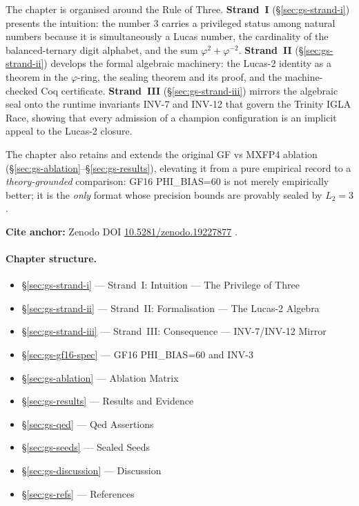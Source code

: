 The chapter is organised around the Rule of Three.
\textbf{Strand~I} (§\ref{sec:gs-strand-i}) presents the
intuition: the number $3$ carries a privileged status among
natural numbers because it is simultaneously a Lucas number,
the cardinality of the balanced-ternary digit alphabet, and
the sum $\varphi^2 + \varphi^{-2}$.  \textbf{Strand~II}
(§\ref{sec:gs-strand-ii}) develops the formal algebraic
machinery: the Lucas-2 identity as a theorem in the
$\varphi$-ring, the sealing theorem and its proof, and the
machine-checked Coq certificate.  \textbf{Strand~III}
(§\ref{sec:gs-strand-iii}) mirrors the algebraic seal onto
the runtime invariants INV-7 and INV-12 that govern the
Trinity IGLA Race, showing that every admission of a
champion configuration is an implicit appeal to the Lucas-2
closure.

The chapter also retains and extends the original GF vs
MXFP4 ablation (§\ref{sec:gs-ablation}--§\ref{sec:gs-results}),
elevating it from a pure empirical record to a
\emph{theory-grounded} comparison: GF16 PHI\_BIAS=60 is not
merely empirically better; it is the \emph{only} format
whose precision bounds are provably sealed by $L_2 = 3$.

\bigskip
\noindent\textbf{Cite anchor:}
Zenodo DOI \href{https://doi.org/10.5281/zenodo.19227877}{10.5281/zenodo.19227877}
\citep{zenodo_trinity_anchor_2026}.

\paragraph{Chapter structure.}
\begin{itemize}\tightlist
  \item §\ref{sec:gs-strand-i} — Strand~I: Intuition — The Privilege of Three
  \item §\ref{sec:gs-strand-ii} — Strand~II: Formalisation — The Lucas-2 Algebra
  \item §\ref{sec:gs-strand-iii} — Strand~III: Consequence — INV-7/INV-12 Mirror
  \item §\ref{sec:gs-gf16-spec} — GF16 PHI\_BIAS=60 and INV-3
  \item §\ref{sec:gs-ablation} — Ablation Matrix
  \item §\ref{sec:gs-results} — Results and Evidence
  \item §\ref{sec:gs-qed} — Qed Assertions
  \item §\ref{sec:gs-seeds} — Sealed Seeds
  \item §\ref{sec:gs-discussion} — Discussion
  \item §\ref{sec:gs-refs} — References
\end{itemize}

